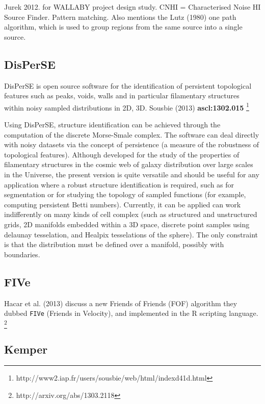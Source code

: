 \documentclass[preprint]{aastex} %
\begin{document}
Jurek 2012. for WALLABY project design study. CNHI = 
Characterised Noise HI Source Finder. Pattern matching. Also mentions the
Lutz (1980) one path algorithm, which is used to group regions from
the same source into a single source.


\subsection{DisPerSE}

DisPerSE is open source software for the identification of persistent
topological features such as peaks, voids, walls and in particular
filamentary structures within noisy sampled distributions in 2D,
3D. Sousbie (2013) {\bf ascl:1302.015}
\footnote{http://www2.iap.fr/users/sousbie/web/html/indexd41d.html}
 

Using DisPerSE, structure identification can be achieved through
the computation of the discrete Morse-Smale complex. The software can
deal directly with noisy datasets via the concept of persistence (a
measure of the robustness of topological features). Although developed
for the study of the properties of filamentary structures in the
cosmic web of galaxy distribution over large scales in the Universe,
the present version is quite versatile and should be useful for any
application where a robust structure identification is required, such
as for segmentation or for studying the topology of sampled functions
(for example, computing persistent Betti numbers). Currently, it can
be applied can work indifferently on many kinds of cell complex (such
as structured and unstructured grids, 2D manifolds embedded within a
3D space, discrete point samples using delaunay tesselation, and
Healpix tesselations of the sphere). The only constraint is that the
distribution must be defined over a manifold, possibly with
boundaries.


\subsection{FIVe}

Hacar et al. (2013) discuss a new Friends of Friends (FOF) 
algorithm they dubbed {\tt FIVe} (Friends in Velocity), and
implemented in the R scripting language.
\footnote{http://arxiv.org/abs/1303.2118}


\subsection{Kemper}
\end{document}
